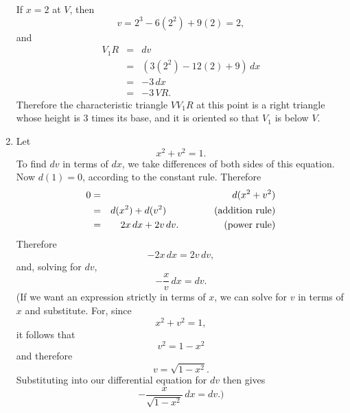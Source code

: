 \documentclass[twoside,openright]{article}
\begin{document}
\begin{enumerate}
If $x= 2$ at $V$, then 
$$v = 2^3 - 6(2^2) + 9(2) = 2,$$
and
\begin{eqnarray*}
V_1R & = & dv\\
& = & (3(2^2) - 12(2) +9)\,dx\\
& = & -3\,dx\\
& = & -3\,VR.
\end{eqnarray*}
Therefore the characteristic triangle $VV_1R$ at this point is a right
triangle whose height is 3 times its base, and it is oriented so that
$V_1$ is below $V$.

\item Let 
$$x^2 + v^2 =1.$$ 
To find $dv$ in terms of $dx$, we take differences of both sides of
this equation.  Now $d(1) =0$, according to the constant rule.
Therefore
\begin{eqnarray*}
0 & = & d(x^2 + v^2) \\
& = & d(x^2) + d(v^2) \mbox{\hspace{5em}(addition rule)}\\
& = & 2x\,dx + 2v\,dv. \mbox{\hspace{4.4em} (power rule)}\\
\end{eqnarray*}
Therefore
$$-2x\,dx = 2v\,dv,$$
and, solving for $dv$,
$$-\frac{x}{v}\,dx = dv.$$
(If we want an expression strictly in terms of $x$, we can solve for
$v$ in terms of $x$ and substitute.  For, since
$$x^2 + v^2 = 1,$$
it follows that 
$$v^2 = 1 - x^2$$
and therefore
$$v = \sqrt{1 -x^2}.$$
Substituting into our differential equation for $dv$ then gives
$$-\frac{x}{\sqrt{1-x^2}}\,dx = dv.)$$



\end{enumerate}
\end{document}
